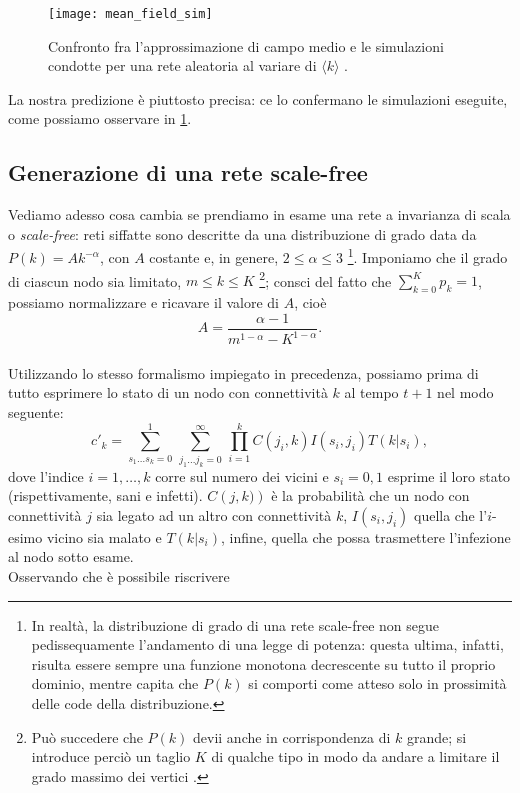 \begin{figure}[t]
		\begin{center}
			\texttt{[image: mean\_field\_sim]}
			\caption{Confronto fra l'approssimazione di campo medio e le simulazioni condotte per una rete aleatoria al variare di $ \langle k \rangle $ \cite{Bagnoli2014} .}
			\label{fig:sim}
		\end{center}
\end{figure}
La nostra predizione è piuttosto precisa: ce lo confermano le simulazioni eseguite, come possiamo osservare in \cref{fig:sim}.

\subsection{Generazione di una rete scale-free}
Vediamo adesso cosa cambia se prendiamo in esame una rete a invarianza di scala o \emph{scale-free}: reti siffatte sono descritte da una distribuzione di grado data da $ P\left(k\right) = A k^{-\alpha} $, con $ A $ costante e, in genere, $ 2 \leq \alpha \leq 3 $ \footnote{In realtà, la distribuzione di grado di una rete scale-free non segue pedissequamente l'andamento di una legge di potenza: questa ultima, infatti, risulta essere sempre una funzione monotona decrescente su tutto il proprio dominio, mentre capita che $ P\left(k\right) $ si comporti come atteso solo in prossimità delle code della distribuzione.}. 
Imponiamo che il grado di ciascun nodo sia limitato, $ m \leq k \leq K $ \footnote{Può succedere che $ P\left(k\right)$ devii anche in corrispondenza di $ k $ grande; si introduce perciò un taglio $ K $ di qualche tipo in modo da andare a limitare il grado massimo dei vertici \cite{Newman}.}; 
consci del fatto che $ \sum_{k = 0}^K p_k = 1 $, possiamo normalizzare e ricavare il valore di $ A $, cioè 
\[
 A = \frac{ \alpha - 1}{m^{1 - \alpha} - K^{1 - \alpha}}.
\]
 \\ Utilizzando lo stesso formalismo impiegato in precedenza, possiamo prima di tutto esprimere lo stato di un nodo con connettività $ k $ al tempo $ t + 1 $ nel modo seguente:
\begin{equation}
	c'_k = \sum_{s_1 \dots s_k = 0}^1 \, \sum_{j_1 \dots j_k = 0}^ \infty \, \prod_{i = 1}^k C\left(j_i,k\right) I\left(s_i, j_i\right) T\left(k|s_i\right),
\end{equation}
dove l'indice $ i = 1, \dots, k $ corre sul numero dei vicini e $ s_i = 0, 1 $ esprime il loro stato (rispettivamente, sani e infetti). $ C\left(j,k)\right) $ è la probabilità che un nodo con connettività $ j $ sia legato ad un altro con connettività $ k $, $ I\left(s_i, j_i\right) $ quella che l'$ i $-esimo vicino sia malato e $ T\left(k|s_i\right) $, infine, quella che possa trasmettere l'infezione al nodo sotto esame. \\ Osservando che è possibile riscrivere
